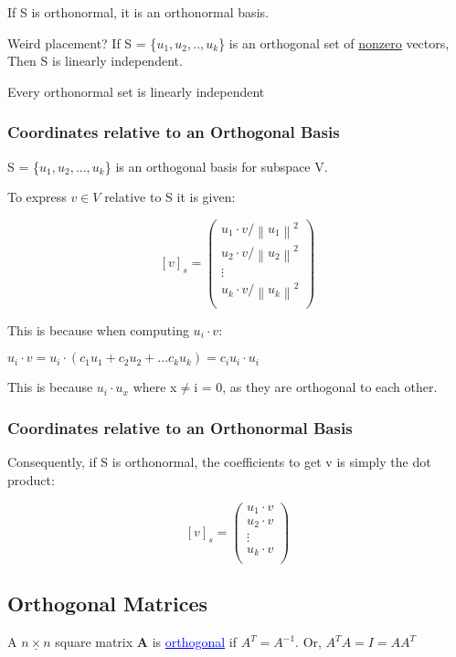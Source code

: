 \documentclass{article}
\newcommand{\bul}[1]{\textcolor{blue}{\underline{#1}}}
\begin{document}
If S is orthonormal, it is an orthonormal basis.

Weird placement?
If S = \{$u_1,u_2,..,u_k$\} is an orthogonal set of \underline{nonzero} vectors, Then S is linearly independent.

Every orthonormal set is linearly independent

\subsubsection{Coordinates relative to an Orthogonal Basis}
S = \{$u_1,u_2,...,u_k$\} is an orthogonal basis for subspace V.

To express $v\in V$ relative to S it is given:
\begin{center}
    \[
        [v]_s = \begin{pmatrix}
            u_1 \cdot v/\left\lVert u_1\right\rVert ^2\\
            u_2 \cdot v/\left\lVert u_2\right\rVert ^2\\
            \vdots\\
            u_k \cdot v/\left\lVert u_k\right\rVert ^2\\
        \end{pmatrix}
    \]
\end{center}

This is because when computing $u_i \cdot v$:

$u_i \cdot v = u_i \cdot (c_1u_1 + c_2u_2 + ... c_ku_k) = c_iu_i \cdot u_i$

This is because $u_i \cdot u_x$ where x$\neq$i = 0, as they are orthogonal to each other.

\subsubsection{Coordinates relative to an Orthonormal Basis}
Consequently, if S is orthonormal, the coefficients to get v is simply the dot product:
\begin{center}
    \[
        [v]_s = \begin{pmatrix}
            u_1 \cdot v\\
            u_2 \cdot v\\
            \vdots\\
            u_k \cdot v\\
        \end{pmatrix}
    \]
\end{center}

\subsection{Orthogonal Matrices}
A $\underline{n \times n}$ square matrix \textbf{A} is \bul{orthogonal} if $A^T=A^{-1}$. Or,
$A^TA=I=AA^T$
\end{document}
